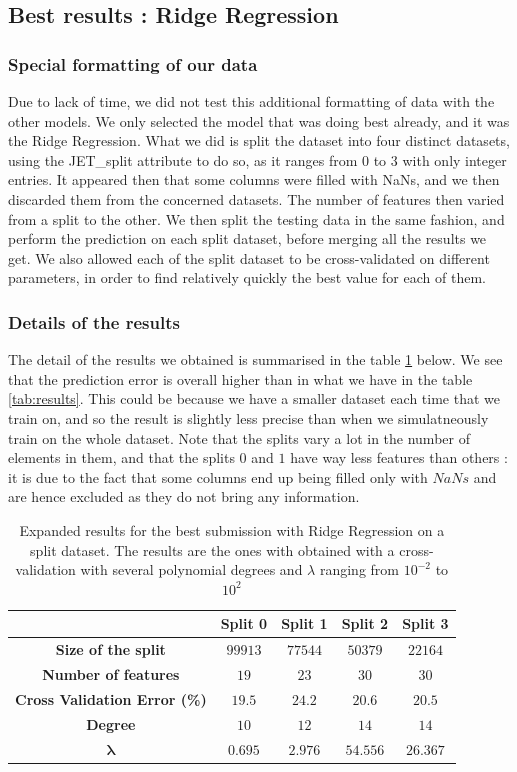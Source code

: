 \documentclass[10pt,conference,compsocconf]{IEEEtran}
\begin{document}
\subsection{Best results : Ridge Regression}
\subsubsection{Special formatting of our data}
Due to lack of time, we did not test this additional formatting of data with the other models. We only selected the model that was doing best already, and it was the Ridge Regression. What we did is split the dataset into four distinct datasets, using the JET\_split attribute to do so, as it ranges from $0$ to $3$ with only integer entries. It appeared then that some columns were filled with NaNs, and we then discarded them from the concerned datasets. The number of features then varied from a split to the other. We then split the testing data in the same fashion, and perform the prediction on each split dataset, before merging all the results we get. We also allowed each of the split dataset to be cross-validated on different parameters, in order to find relatively quickly the best value for each of them.


\subsubsection{Details of the results}
The detail of the results we obtained is summarised in the table \ref{tab:RR} below. We see that the prediction error is overall higher than in what we have in the table \ref{tab:results}. This could be because we have a smaller dataset each time that we train on, and so the result is slightly less precise than when we simulatneously train on the whole dataset. Note that the splits vary a lot in the number of elements in them, and that the splits $0$ and $1$ have way less features than others : it is due to the fact that some columns end up being filled only with $NaNs$ and are hence excluded as they do not bring any information.

\begin{table}[!ht]
	\centering
	\begin{tabular}{c||c|c|c|c}
		&\textbf{Split 0} & \textbf{Split 1} & \textbf{Split 2}& \textbf{Split 3}\\
		\hline
		\textbf{Size of the split} & $99913$ & $77544$& $50379$ & $22164$\\
		\hline
		\textbf{Number of features} & $19$ & $23$ & $30$ & $30$ \\
		\hline
		\textbf{Cross Validation Error (\%)} & $19.5$&$24.2$&$20.6$&$20.5$\\
		\hline
		\textbf{Degree} & $10$ & $12$ & $14$ & $14$ \\
		\hline
		{$\mathbf{\lambda}$} & $0.695$ & $2.976$ & $54.556$ & $26.367$\\
	\end{tabular}
	\caption{Expanded results for the best submission with Ridge Regression on a split dataset. The results are the ones with obtained with a cross-validation with several polynomial degrees and $\lambda$ ranging from $10^{-2}$ to $10^{2}$}
	\label{tab:RR}
\end{table}
\end{document}
